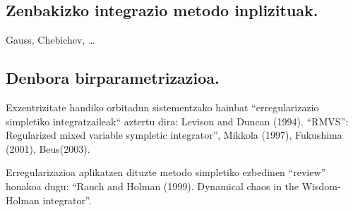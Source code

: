 \subsection*{Zenbakizko integrazio metodo inplizituak.}

Gauss, Chebichev, \dots 

\subsection*{Denbora birparametrizazioa.}

Exzentrizitate handiko orbitadun sistementzako hainbat “erregularizazio simpletiko integratzaileak“ aztertu dira:
Levison and Duncan (1994). “RMVS”: Regularized mixed variable sympletic integrator”, Mikkola (1997), Fukushima (2001), Beus(2003).

Erregularizazioa aplikatzen dituzte metodo simpletiko ezbedinen “review” honakoa dugu: “Rauch
and Holman (1999). Dynamical chaos in the Wisdom-Holman integrator”.

